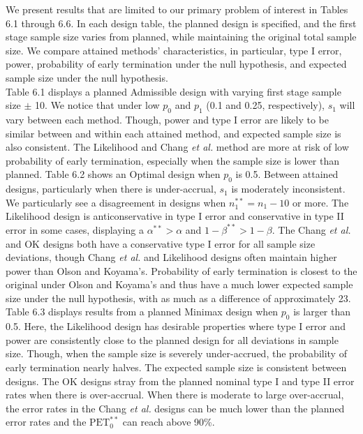 \documentclass[12pt]{report}\usepackage[]{graphicx}\usepackage[]{color}
\newlength{\li}\setlength{\li}{14.48pt}
\newlength{\di}\setlength{\di}{-3.5mm}
\begin{document}
\indent We present results that are limited to our primary problem of interest in Tables 6.1 through 6.6. In each design table, the planned design is specified, and the first stage sample size varies from planned, while maintaining the original total sample size. We compare attained methods' characteristics, in particular, type I error, power, probability of early termination under the null hypothesis, and expected sample size under the null hypothesis. \\
\indent Table 6.1 displays a planned Admissible design with varying first stage sample size $\pm$ 10. We notice that under low $p_0$ and $p_1$ (0.1 and 0.25, respectively), $s_1$ will vary between each method. Though, power and type I error are likely to be similar between and within each attained method, and expected sample size is also consistent. The Likelihood and Chang \textit{et al.} method are more at risk of low probability of early termination, especially when the sample size is lower than planned. Table 6.2 shows an Optimal design when $p_0$ is 0.5. Between attained designs, particularly when there is under-accrual, $s_1$ is moderately inconsistent. We particularly see a disagreement in designs when $n_1^{\ast\ast} = n_1 - 10$ or more.  The Likelihood design is anticonservative in type I error and conservative in type II error in some cases, displaying a $\alpha^{\ast\ast} > \alpha$ and $1-\beta^{\ast\ast} > 1-\beta$. The Chang \textit{et al.} and OK designs both have a conservative type I error for all sample size deviations, though Chang \textit{et al.} and Likelihood designs often maintain higher power than Olson and Koyama's. Probability of early termination is closest to the original under Olson and Koyama's and thus have a much lower expected sample size under the null hypothesis, with as much as a difference of approximately 23.\\
\indent Table 6.3 displays results from a planned Minimax design when $p_0$ is larger than 0.5. Here, the Likelihood design has desirable properties where type I error and power are consistently close to the planned design for all deviations in sample size. Though, when the sample size is severely under-accrued, the probability of early termination nearly halves. The expected sample size is consistent between designs. The OK designs stray from the planned nominal type I and type II error rates when there is over-accrual. When there is moderate to large over-accrual, the error rates in the Chang \textit{et al.} designs can be much lower than the planned error rates and the $\mbox{PET}^{\ast\ast}_0$ can reach above 90\%. \\
\end{document}
